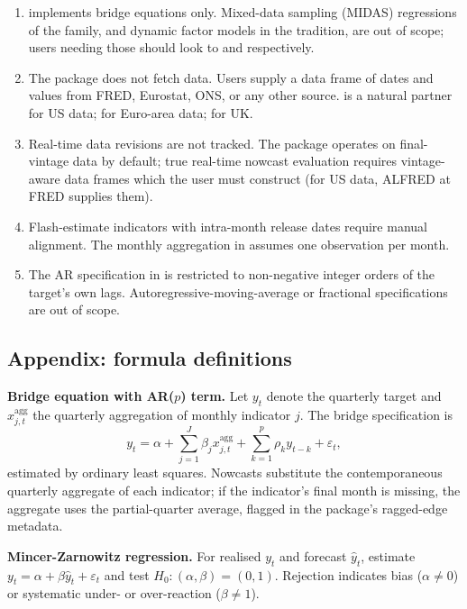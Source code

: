 \begin{enumerate}
\def\labelenumi{\arabic{enumi}.}
\tightlist
\item
   implements bridge equations only. Mixed-data
  sampling (MIDAS) regressions of the \citet{ghysels2004midas} family,
  and dynamic factor models in the \citet{giannone2008nowcasting}
  tradition, are out of scope; users needing those should look to
   and  respectively.
\item
  The package does not fetch data. Users supply a data frame of dates
  and values from FRED, Eurostat, ONS, or any other source.
   is a natural partner for US data; 
  for Euro-area data;  for UK.
\item
  Real-time data revisions are not tracked. The package operates on
  final-vintage data by default; true real-time nowcast evaluation
  requires vintage-aware data frames which the user must construct (for
  US data, ALFRED at FRED supplies them).
\item
  Flash-estimate indicators with intra-month release dates require
  manual alignment. The monthly aggregation in 
  assumes one observation per month.
\item
  The AR specification in  is restricted to
  non-negative integer orders of the target's own lags.
  Autoregressive-moving-average or fractional specifications are out of
  scope.
\end{enumerate}

\FloatBarrier

\subsection{Appendix: formula
definitions}\label{appendix-formula-definitions}

\textbf{Bridge equation with AR(\(p\)) term.} Let \(y_t\) denote the
quarterly target and \(x_{j,t}^{\mathrm{agg}}\) the quarterly
aggregation of monthly indicator \(j\). The bridge specification is
\[y_t = \alpha + \sum_{j=1}^{J} \beta_j x_{j,t}^{\mathrm{agg}}
  + \sum_{k=1}^{p} \rho_k y_{t-k} + \varepsilon_t,\] estimated by
ordinary least squares. Nowcasts substitute the contemporaneous
quarterly aggregate of each indicator; if the indicator's final month is
missing, the aggregate uses the partial-quarter average, flagged in the
package's ragged-edge metadata.

\textbf{Mincer-Zarnowitz regression.} For realised \(y_t\) and forecast
\(\hat{y}_t\), estimate
\(y_t = \alpha + \beta \hat{y}_t + \varepsilon_t\) and test
\(H_0: (\alpha, \beta) = (0, 1)\). Rejection indicates bias
(\(\alpha \neq 0\)) or systematic under- or over-reaction
(\(\beta \neq 1\)).

